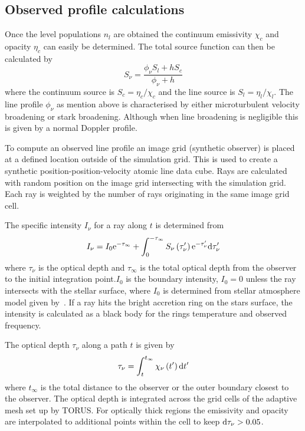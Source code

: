 \documentclass[fleqn,usenatbib]{mnras}
\begin{document}
\subsection{Observed profile calculations}
\label{sec:profilecalculations}
Once the level populations $n_{l}$ are obtained the continuum emissivity $\chi_c$ and opacity $\eta_c$ can easily be determined. The total source function can then be calculated by
\begin{equation}
    S_{\nu} = \frac{\phi_{\nu}S_l+hS_{c}}{\phi_{\nu}+h}
\end{equation}
where the continuum source is $S_{c}=\eta_{c}/\chi_{c}$ and the line source is $S_{l}=\eta_{l}/\chi_{l}$. The line profile $\phi_{\nu}$ as mention above is characterised by either microturbulent velocity broadening or stark broadening. Although when line broadening is negligible this is given by a normal Doppler profile.

To compute an observed line profile an image grid (synthetic observer) is placed at a defined location outside of the simulation grid. This is used to create a synthetic position-position-velocity atomic line data cube. Rays are calculated with random position on the image grid intersecting with the simulation grid. Each ray is weighted by the number of rays originating in the same image grid cell.

The specific intensity $I_{\nu}$ for a ray along $t$ is determined from
\begin{equation}
I_{\nu} = I_{0}{\rm e}^{-\tau_{\infty}} + \int^{-\tau_{\infty}}_{0}S_{\nu}\left(\tau_{\nu}'\right){\rm e}^{-\tau_{\nu}'}{\rm d}\tau_{\nu}'
\end{equation}
where $\tau_{\nu}$ is the optical depth and $\tau_{\infty}$ is the total optical depth from the observer to the initial integration point.$I_0$ is the boundary intensity, $I_0=0$ unless the ray intersects with the stellar surface, where $I_0$ is determined from stellar atmosphere model given by~\citet{1979ApJS...40....1K}. If a ray hits the bright accretion ring on the stars surface, the intensity is calculated as a black body for the rings temperature and observed frequency.

The optical depth $\tau_{\nu}$ along a path $t$ is given by
\begin{equation}
    \tau_{\nu} = \int_{t}^{t_{\infty}} \chi_{\nu}\left(t' \right){\rm d}t'
\end{equation}
where $t_{\infty}$ is the total distance to the observer or the outer boundary closest to the observer. The optical depth is integrated across the grid cells of the adaptive mesh set up by TORUS. For optically thick regions the emissivity and opacity are interpolated to additional points within the cell to keep ${\rm d}\tau_{\nu} > 0.05$. 
\end{document}
